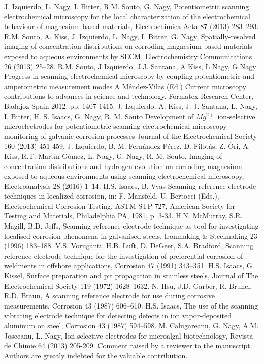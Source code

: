 \documentclass[3p]{elsarticle}
\begin{document}
\begin{thebibliography}{5}
J. Izquierdo, L. Nagy, I. Bitter, R.M. Souto, G. Nagy, 
Potentiometric scanning electrochemical microscopy for the local characterization of the electrochemical behaviour of magnesium-based materials, Electrochimica Acta 87 (2013) 283–293.
R.M. Souto, A. Kiss, J. Izquierdo, L. Nagy, I. Bitter, G. Nagy, Spatially-resolved imaging of concentration distributions on corroding magnesium-based materials exposed to aqueous environments by SECM, Electrochemistry Communications 26 (2013) 25–28.
R.M. Souto, J Izquierdo, J.J. Santana, A Kiss, L Nagy, G Nagy 
Progress in scanning electrochemical microscopy by coupling potentiometric and amperometric measurement modes
A Méndez-Vilas (Ed.)
Current microscopy contributions to advances in science and technology. Formatex Research Center, Badajoz Spain 2012. pp. 1407-1415.
J. Izquierdo, A. Kiss, J. J. Santana, L. Nagy, I. Bitter, H. S. Isaacs, G. Nagy, R. M. Souto
Development of $Mg^{2+}$ ion-selective microelectrodes for potentiometric scanning electrochemical microscopy monitoring of galvanic corrosion processes
Journal of the Electrochemical Society  160 (2013) 451-459. 
J. Izquierdo, B. M. Fernández-Pérez, D. Filotás, Z. Őri, A. Kiss, R.T. Martín-Gómez, L. Nagy, G. Nagy, R. M. Souto, Imaging of concentration distributions and hydrogen evolution on corroding magnesium exposed to aqueous environments using scanning electrochemical microscopy, Electroanalysis 28 (2016) 1–14.
H.S. Isaacs, B. Vyas Scanning reference electrode techniques in localized corrosion, in: F. Mansfeld, U. Bertocci (Eds.), Electrochemical Corrosion Testing, ASTM STP 727, American Society for Testing and Materials, Philadelphia PA, 1981, p. 3-33.
H.N. McMurray, S.R. Magill, B.D. Jeffs, Scanning reference electrode technique as tool for investigating localised corrosion phenomena in galvanised steels, Ironmaking \& Steelmaking 23 (1996) 183–188.
V.S. Voruganti, H.B. Luft, D. DeGeer, S.A. Bradford, Scanning reference electrode technique for the investigation of preferential corrosion of weldments in offshore applications, Corrosion 47 (1991) 343–351.
H.S. Isaacs, G. Kissel, Surface preparation and pit propagation in stainless steels, Journal of The Electrochemical Society 119 (1972) 1628–1632.
N. Hsu, J.D. Garber, R. Brunel, R.D. Braun, A scanning reference electrode for use during corrosive measurements, Corrosion 43 (1987) 606–610.
H.S. Isaacs, The use of the scanning vibrating electrode technique for detecting defects in ion vapor-deposited aluminum on steel, Corrosion 43 (1987) 594–598.
 M. Calugareanu, G. Nagy, A.M. Josceanu, L. Nagy, Ion selective electrodes for microalgal biotechnology, Revista de Chimie 64 (2013) 205-209.
 Comment raised by a reviewer to the manuscript. Authors are greatly indebted for the valuable contribution.
\end{thebibliography}
\end{document}
